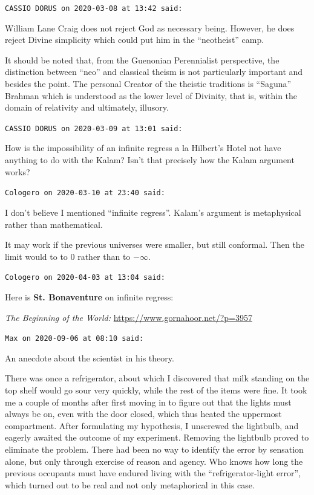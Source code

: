 \begin{footnotesize}
\begin{sffamily}
\hfill

\texttt{CASSIO DORUS on 2020-03-08 at 13:42 said:}

William Lane Craig does not reject God as necessary being. However, he does reject Divine simplicity which could put him in the ``neotheist'' camp.

It should be noted that, from the Guenonian Perennialist perspective, the distinction between ``neo'' and classical theism is not particularly important and besides the point. The personal Creator of the theistic traditions is ``Saguna'' Brahman which is understood as the lower level of Divinity, that is, within the domain of relativity and ultimately, illusory.

\hfill

\texttt{CASSIO DORUS on 2020-03-09 at 13:01 said:}

How is the impossibility of an infinite regress a la Hilbert's Hotel not have anything to do with the Kalam? Isn't that precisely how the Kalam argument works?

\hfill

\texttt{Cologero on 2020-03-10 at 23:40 said:}

I don't believe I mentioned ``infinite regress''. Kalam's argument is metaphysical rather than mathematical.

It may work if the previous universes were smaller, but still conformal. Then the limit would to to 0 rather than to $-\infty$.

\hfill

\texttt{Cologero on 2020-04-03 at 13:04 said:}

Here is \textbf{St. Bonaventure} on infinite regress:

\textit{The Beginning of the World:} \url{https://www.gornahoor.net/?p=3957}


\hfill

\texttt{Max on 2020-09-06 at 08:10 said:}

An anecdote about the scientist in his theory.

There was once a refrigerator, about which I discovered that milk standing on the top shelf would go sour very quickly, while the rest of the items were fine. It took me a couple of months after first moving in to figure out that the lights must always be on, even with the door closed, which thus heated the uppermost compartment. After formulating my hypothesis, I unscrewed the lightbulb, and eagerly awaited the outcome of my experiment. Removing the lightbulb proved to eliminate the problem. There had been no way to identify the error by sensation alone, but only through exercise of reason and agency. Who knows how long the previous occupants must have endured living with the ``refrigerator-light error'', which turned out to be real and not only metaphorical in this case.


\end{sffamily}
\end{footnotesize}

